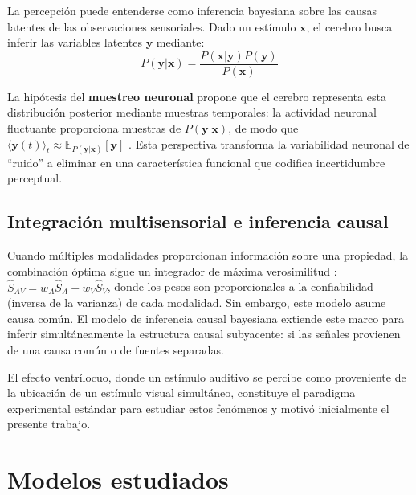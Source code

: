 \documentclass[spanish,a4paper,11pt]{article}
\begin{document}
La percepción puede entenderse como inferencia bayesiana sobre las causas latentes de las observaciones sensoriales. Dado un estímulo $\mathbf{x}$, el cerebro busca inferir las variables latentes $\mathbf{y}$ mediante:
\begin{equation}
P(\mathbf{y}|\mathbf{x}) = \frac{P(\mathbf{x}|\mathbf{y})P(\mathbf{y})}{P(\mathbf{x})}
\label{eq:bayes}
\end{equation}

La hipótesis del \textbf{muestreo neuronal} propone que el cerebro representa esta distribución posterior mediante muestras temporales: la actividad neuronal fluctuante proporciona muestras de $P(\mathbf{y}|\mathbf{x})$, de modo que $\langle \mathbf{y}(t) \rangle_t \approx \mathbb{E}_{P(\mathbf{y}|\mathbf{x})}[\mathbf{y}]$ \citep{echeveste2020cortical}. Esta perspectiva transforma la variabilidad neuronal de ``ruido'' a eliminar en una característica funcional que codifica incertidumbre perceptual.

\subsection{Integración multisensorial e inferencia causal}

Cuando múltiples modalidades proporcionan información sobre una propiedad, la combinación óptima sigue un integrador de máxima verosimilitud \citep{alais2004ventriloquist}: $\hat{S}_{AV} = w_A \hat{S}_A + w_V \hat{S}_V$, donde los pesos son proporcionales a la confiabilidad (inversa de la varianza) de cada modalidad. Sin embargo, este modelo asume causa común. El modelo de inferencia causal bayesiana \citep{kording2007causal} extiende este marco para inferir simultáneamente la estructura causal subyacente: si las señales provienen de una causa común o de fuentes separadas.

El efecto ventrílocuo, donde un estímulo auditivo se percibe como proveniente de la ubicación de un estímulo visual simultáneo, constituye el paradigma experimental estándar para estudiar estos fenómenos y motivó inicialmente el presente trabajo.


\section{Modelos estudiados}
\label{sec:modelos}
\end{document}
